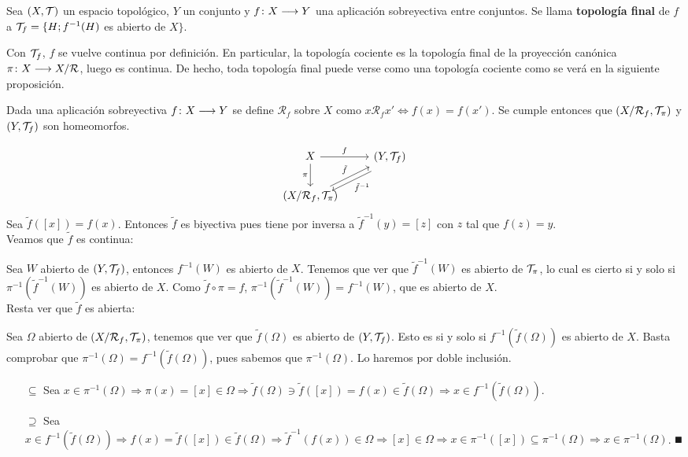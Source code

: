 \documentclass[GTS.tex]{subfiles}
\begin{document}
\begin{defi}Sea $(X,\mathcal{T})$ un espacio topológico, $Y$ un conjunto y $f\colon{X}\longrightarrow{Y}$ una aplicación sobreyectiva entre conjuntos. Se llama \textbf{topología final} de $f$ a $\mathcal{T}_f=\{H ; f^{-1}(H)$ es abierto de $X\}$.
\end{defi}
\begin{observacion}  Con $\mathcal{T}_f$, $f$ se vuelve continua por definición. En particular, la topología cociente es la topología final de la proyección canónica $\pi\colon{X}\longrightarrow{X/\mathcal{R}}$, luego es continua. De hecho, toda topología final puede verse como una topología cociente como se verá en la siguiente proposición.
\end{observacion}
\begin{prop}\label{146} Dada una aplicación sobreyectiva $f\colon{X}\longrightarrow{Y}$ se define $\mathcal{R}_f$ sobre $X$ como $x\mathcal{R}_f x'\Leftrightarrow f(x)=f(x')$. Se cumple entonces que $\left(X/\mathcal{R}_f,\mathcal{T}_\pi\right)$ y $(Y,\mathcal{T}_f)$ son homeomorfos.
\end{prop}
\begin{dem}
\[
\begin{tikzcd}
X \ar[r, "f"]\arrow[d,"\pi "'] & \left(Y,\Tau_f\right)\arrow[dl,shift left=1ex,"\tilde{f}^{-1} "]\\
\left(X/\mathcal{R}_f,\Tau_\pi\right) \arrow[ur,"\tilde{f} "]
\end{tikzcd}
\]
Sea $\tilde{f}([x])=f(x)$. Entonces $\tilde{f}$ es biyectiva pues tiene por inversa a $\tilde{f}^{-1}(y)=[z]$ con $z$ tal que $f(z)=y$.\\
Veamos que $\tilde{f}$ es continua:

Sea $W$ abierto de $(Y,\mathcal{T}_f)$, entonces $f^{-1}(W)$ es abierto de $X$. Tenemos que ver que $\tilde{f}^{-1}(W)$ es abierto de $\mathcal{T}_\pi$, lo cual es cierto si y solo si $\pi^{-1}(\tilde{f}^{-1}(W))$ es abierto de $X$. Como $\tilde{f}\circ\pi=f$, $\pi^{-1}(\tilde{f}^{-1}(W))=f^{-1}(W)$, que es abierto de $X$.\\
Resta ver que $\tilde{f}$ es abierta:

Sea $\Omega$ abierto de $(X/\mathcal{R}_f,\mathcal{T}_\pi)$, tenemos que ver que $\tilde{f}(\Omega)$ es abierto de $(Y,\mathcal{T}_f)$. Esto es si y solo si $f^{-1}(\tilde{f}(\Omega))$ es abierto de $X$. Basta comprobar que $\pi^{-1}(\Omega)=f^{-1}(\tilde{f}(\Omega))$, pues sabemos que $\pi^{-1}(\Omega)$. Lo haremos por doble inclusión.
\begin{enumerate}
\item[$\boxed{\subseteq}$] Sea $x\in\pi^{-1}(\Omega)\Rightarrow\pi(x)=[x]\in\Omega\Rightarrow\tilde{f}(\Omega)\ni\tilde{f}([x])=f(x)\in\tilde{f}(\Omega)\Rightarrow x\in f^{-1}(\tilde{f}(\Omega))$.
\item[$\boxed{\supseteq}$] Sea $x\in f^{-1}(\tilde{f}(\Omega))\Rightarrow f(x)=\tilde{f}([x])\in\tilde{f}(\Omega)\Rightarrow\tilde{f}^{-1}(f(x))\in\Omega\Rightarrow [x]\in\Omega\Rightarrow x\in\pi^{-1}([x])\subseteq\pi^{-1}(\Omega)\Rightarrow x\in\pi^{-1}(\Omega)$. $\QED$
\end{enumerate}
\end{dem}
\end{document}
